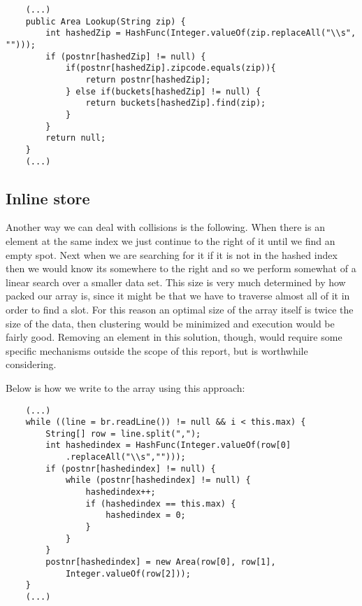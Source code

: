 \documentclass[a4paper,11pt]{article}
\begin{document}
\begin{verbatim}
    (...)
    public Area Lookup(String zip) {
        int hashedZip = HashFunc(Integer.valueOf(zip.replaceAll("\\s", "")));
        if (postnr[hashedZip] != null) {
            if(postnr[hashedZip].zipcode.equals(zip)){
                return postnr[hashedZip];
            } else if(buckets[hashedZip] != null) {
                return buckets[hashedZip].find(zip);
            }
        }
        return null;
    }
    (...)
\end{verbatim}

\subsection*{Inline store}
Another way we can deal with collisions is the following. When there is an element at the same index we just continue to the right of it until we find an empty spot. Next when we are searching for it if it is not in the hashed index then we would know its somewhere to the right and so we perform somewhat of a linear search over a smaller data set. This size is very much determined by how packed our array is, since it might be that we have to traverse almost all of it in order to find a slot. For this reason an optimal size of the array itself is twice the size of the data, then clustering would be minimized and execution would be fairly good. Removing an element in this solution, though, would require some specific mechanisms outside the scope of this report, but is worthwhile considering.

Below is how we write to the array using this approach:

\begin{verbatim}
    (...)
    while ((line = br.readLine()) != null && i < this.max) {
        String[] row = line.split(",");
        int hashedindex = HashFunc(Integer.valueOf(row[0]
            .replaceAll("\\s","")));
        if (postnr[hashedindex] != null) {
            while (postnr[hashedindex] != null) {
                hashedindex++;
                if (hashedindex == this.max) {
                    hashedindex = 0;
                }
            }
        }
        postnr[hashedindex] = new Area(row[0], row[1],
            Integer.valueOf(row[2]));
    }
    (...)
\end{verbatim}
\end{document}
